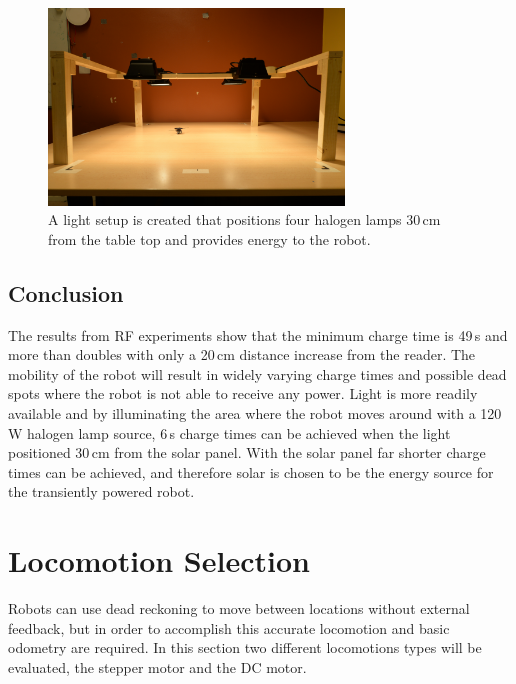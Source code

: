 \begin{figure}
	\centering
	\includegraphics[width=0.7\textwidth]{pics/light_setup.jpg}
	\caption{A light setup is created that positions four halogen lamps 30\,cm from the table top and provides energy to the robot.}
	\label{fig:light_setup}
\end{figure}

\subsection{Conclusion}

The results from RF experiments show that the minimum charge time is 49\,s and more than doubles with only a 20\,cm distance increase from the reader.
The mobility of the robot will result in widely varying charge times and possible dead spots where the robot is not able to receive any power.
Light is more readily available and by illuminating the area where the robot moves around with a 120\,W halogen lamp source, 6\,s charge times can be achieved when the light positioned 30\,cm from the solar panel.
With the solar panel far shorter charge times can be achieved, and therefore solar is chosen to be the energy source for the transiently powered robot.

\section{Locomotion Selection}
\label{sec:pre_locomotion_selection}

Robots can use dead reckoning to move between locations without external feedback, but in order to accomplish this accurate locomotion and basic odometry are required.
In this section two different locomotions types will be evaluated, the stepper motor and the DC motor.

